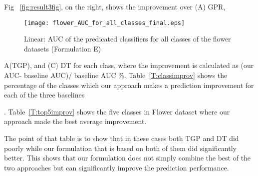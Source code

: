 \begin{table}[t]
\small
\caption{\small Linear: Percentage of classes that the final proposed approach (formulation (E)) makes an improvement in predicting over the baselines (relative to the total number of classes in each dataset}
\label{T:classimprov}
\centering
{}
\end{table}
\begin{comment}
\begin{figure}[t]
\texttt{[image: flower\_AUC\_imp\_final.eps]}
\caption{AUC improvement over the three baselines. The improvement are sorted in a decreasing order for each baseline separately. }
\label{F:AUC_improvement}
\end{figure}
\end{comment}
Fig ~\ref{fig:result3fig}, on the right, shows the improvement over (A) GPR,\begin{figure}
\vspace{-3mm}
\centering
 \hspace*{-12mm}%
\texttt{[image: flower\_AUC\_for\_all\_classes\_final.eps]}
\caption{Linear: AUC of the predicated classifiers for all classes of the flower datasets (Formulation E)}
\label{F:AUCs}
\end{figure} A(TGP), and (C) DT for each class, where the improvement is calculated as (our AUC- baseline AUC)/ baseline AUC \%. 
Table~\ref{T:classimprov} shows the percentage of the classes which our approach makes a prediction improvement for each of  the three baselines\begin{comment}. The last row show the improvement over both the TGP and DT baseline 
\end{comment}
. Table~\ref{T:top5improv} shows the five classes in Flower dataset where our approach made the best average improvement.
\begin{comment}. (TGP+DT).  
\end{comment}
 The point of that table is to show that in these cases both TGP and DT did poorly while our formulation that is based on both of them did significantly better. This shows that our formulation does not simply combine the best of the two approaches but can significantly improve the prediction performance.

